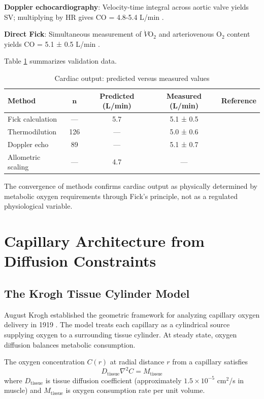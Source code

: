 \documentclass[10pt,twocolumn,a4paper]{article}
\theoremstyle{remark}
\begin{document}
\textbf{Doppler echocardiography}: Velocity-time integral across aortic valve yields SV; multiplying by HR gives CO = 4.8-5.4 L/min \cite{lewis1984pulsed}.

\textbf{Direct Fick}: Simultaneous measurement of $\dot{V}\mathrm{O}_{2}$ and arteriovenous O$_{2}$ content yields CO = 5.1 ± 0.5 L/min \cite{lafarge1970pulmonary}.

Table \ref{tab:cardiac_validation} summarizes validation data.

\begin{table}[h]
\centering
\caption{Cardiac output: predicted versus measured values}
\label{tab:cardiac_validation}
\begin{tabular}{lcccc}
\toprule
\textbf{Method} & \textbf{$\boldsymbol{n}$} & \textbf{Predicted (L/min)} & \textbf{Measured (L/min)} & \textbf{Reference} \\
\midrule
Fick calculation & — & 5.7 & 5.1 ± 0.5 & \cite{lafarge1970pulmonary} \\
Thermodilution & 126 & — & 5.0 ± 0.6 & \cite{ganz1971new} \\
Doppler echo & 89 & — & 5.1 ± 0.7 & \cite{lewis1984pulsed} \\
Allometric scaling & — & 4.7 & — & \cite{west1997general} \\
\bottomrule
\end{tabular}
\end{table}

The convergence of methods confirms cardiac output as physically determined by metabolic oxygen requirements through Fick's principle, not as a regulated physiological variable.

\section{Capillary Architecture from Diffusion Constraints}
\label{sec:capillary}

\subsection{The Krogh Tissue Cylinder Model}

August Krogh established the geometric framework for analyzing capillary oxygen delivery in 1919 \cite{krogh1919number}. The model treats each capillary as a cylindrical source supplying oxygen to a surrounding tissue cylinder. At steady state, oxygen diffusion balances metabolic consumption.

The oxygen concentration $C(r)$ at radial distance $r$ from a capillary satisfies
\begin{equation}
D_{\mathrm{tissue}} \nabla^{2} C = M_{\mathrm{tissue}}
\end{equation}
where $D_{\mathrm{tissue}}$ is tissue diffusion coefficient (approximately $1.5 \times 10^{-5}$ cm$^{2}$/s in muscle) and $M_{\mathrm{tissue}}$ is oxygen consumption rate per unit volume.
\end{document}

